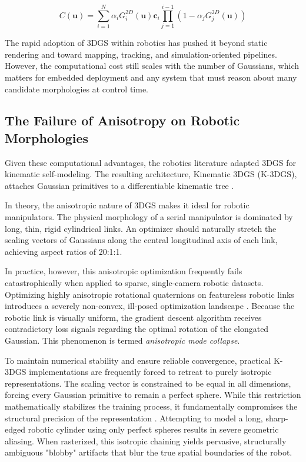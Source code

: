 ﻿\documentclass[12pt,a4paper,oneside]{report}
\begin{document}
\begin{equation}
C(\mathbf{u}) = \sum_{i=1}^{N} \alpha_i G_i^{2D}(\mathbf{u}) \mathbf{c}_i \prod_{j=1}^{i-1} (1 - \alpha_j G_j^{2D}(\mathbf{u}))
\end{equation}

The rapid adoption of 3DGS within robotics has pushed it beyond static rendering and toward mapping, tracking, and simulation-oriented pipelines. However, the computational cost still scales with the number of Gaussians, which matters for embedded deployment and any system that must reason about many candidate morphologies at control time.

\subsection{The Failure of Anisotropy on Robotic Morphologies}

Given these computational advantages, the robotics literature adapted 3DGS for kinematic self-modeling. The resulting architecture, Kinematic 3DGS (K-3DGS), attaches Gaussian primitives to a differentiable kinematic tree \cite{hu2025learning}.

In theory, the anisotropic nature of 3DGS makes it ideal for robotic manipulators. The physical morphology of a serial manipulator is dominated by long, thin, rigid cylindrical links. An optimizer should naturally stretch the scaling vectors of Gaussians along the central longitudinal axis of each link, achieving aspect ratios of 20:1:1.

In practice, however, this anisotropic optimization frequently fails catastrophically when applied to sparse, single-camera robotic datasets. Optimizing highly anisotropic rotational quaternions on featureless robotic links introduces a severely non-convex, ill-posed optimization landscape \cite{hu2025learning}. Because the robotic link is visually uniform, the gradient descent algorithm receives contradictory loss signals regarding the optimal rotation of the elongated Gaussian. This phenomenon is termed \textit{anisotropic mode collapse}.

To maintain numerical stability and ensure reliable convergence, practical K-3DGS implementations are frequently forced to retreat to purely isotropic representations. The scaling vector is constrained to be equal in all dimensions, forcing every Gaussian primitive to remain a perfect sphere. While this restriction mathematically stabilizes the training process, it fundamentally compromises the structural precision of the representation \cite{hu2025learning}. Attempting to model a long, sharp-edged robotic cylinder using only perfect spheres results in severe geometric aliasing. When rasterized, this isotropic chaining yields pervasive, structurally ambiguous "blobby" artifacts that blur the true spatial boundaries of the robot.
\end{document}
